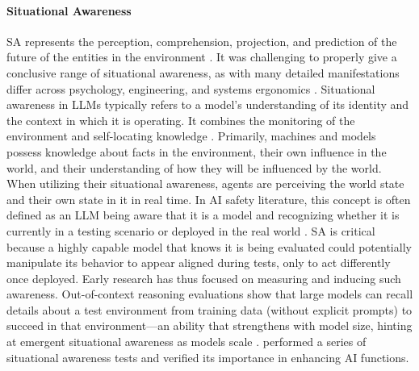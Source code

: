 \paragraph{Situational Awareness} 
SA represents the perception, comprehension, projection, and prediction of the future of the entities in the environment \citep{munir2022situational, endsley2000theoretical, nofi2000defining}. It was challenging to properly give a conclusive range of situational awareness, as with many detailed manifestations differ across psychology, engineering, and systems ergonomics \citep{sarter2017situation, nofi2000defining, stanton2010situation}. Situational awareness in LLMs typically refers to a model's understanding of its identity and the context in which it is operating. It combines the monitoring of the environment and self-locating knowledge \citep{berglund2023situational, laine2023towards,laine2024me}. Primarily, machines and models possess knowledge about facts in the environment, their own influence in the world, and their understanding of how they will be influenced by the world. When utilizing their situational awareness, agents are perceiving the world state and their own state in it in real time. In AI safety literature, this concept is often defined as an LLM being aware that it is a model and recognizing whether it is currently in a testing scenario or deployed in the real world \citep{berglund2023situational}. SA is critical because a highly capable model that knows it is being evaluated could potentially manipulate its behavior to appear aligned during tests, only to act differently once deployed. Early research has thus focused on measuring and inducing such awareness. Out-of-context reasoning evaluations show that large models can recall details about a test environment from training data (without explicit prompts) to succeed in that environment—an ability that strengthens with model size, hinting at emergent situational awareness as models scale \citep{berglund2023situational}. \citet{laine2023towards, laine2024me} performed a series of situational awareness tests and verified its importance in enhancing AI functions.  

